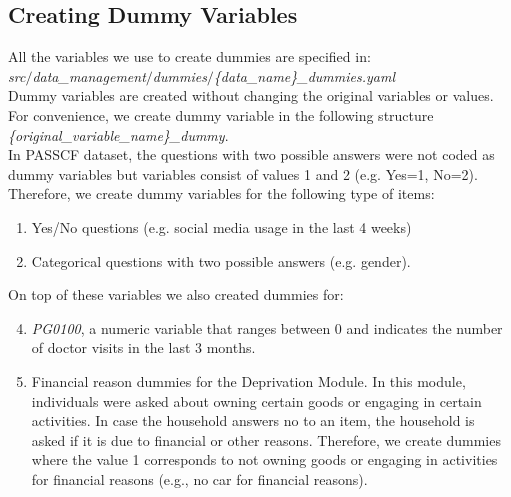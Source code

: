 \documentclass[11pt, a4paper, leqno]{article}
\begin{document}
\subsection{Creating Dummy Variables}
All the variables we use to create dummies are specified in:
\\ \emph {src$/$data\_management$/$dummies$/$\{data\_name\}\_dummies.yaml}\\
Dummy variables are created without changing the original variables or values. For convenience, we create dummy variable in the following structure \emph {\{original\_variable\_name\}\_dummy}.\\[12pt]
In PASS\-CF dataset, the questions with two possible answers were not coded as dummy variables but variables consist of values 1 and 2 (e.g. Yes=1, No=2). Therefore, we create dummy variables for the following type of items:
\begin{enumerate}
\item  Yes/No questions (e.g. social media usage in the last 4 weeks)
\item Categorical questions with two possible answers (e.g. gender).
\end{enumerate}
On top of these variables we also created dummies for:
\begin{enumerate}
\setcounter{enumi}{3}
\item \emph {PG0100}, a numeric variable that ranges between 0 and indicates the number of doctor visits in the last 3 months.
\item Financial reason dummies for the Deprivation Module. In this module, individuals were asked about owning certain goods or engaging in certain activities. In case the household answers no to an item, the household is asked if it is due to financial or other reasons. Therefore, we create dummies where the value 1 corresponds to not owning goods or engaging in activities for financial reasons (e.g., no car for financial reasons).
\end{enumerate}
\end{document}
